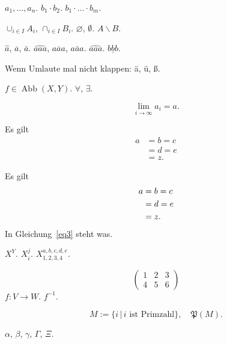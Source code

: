 \documentclass[a4paper,11pt]{article}
\renewcommand{\P}{{\mathfrak P}}
\newcommand{\Abb}{\operatorname{Abb}}
\theoremstyle{definition}
\theoremstyle{plain}
\begin{document}
\medskip

\noindent
$a_1, \dots, a_n$. $b_1 \cdot b_2$. $b_1 \cdot \dots \cdot b_m$.

\medskip

\noindent
$\cup_{i \in I} A_i$, $\cap_{i \in I} B_i$. $\varnothing$,
$\emptyset$. $A \backslash B$.

\medskip

\noindent
$\hat{a}$, $\overline{a}$, $\bar{a}$. $\hat{aaa}$, $\overline{aaa}$,
$\bar{aaa}$. $\widehat{aaa}$. $\underline{bbb}$.

\medskip

\noindent
Wenn Umlaute mal nicht klappen: \"a, \"u, \ss{}.

\medskip

\noindent
$f \in \Abb(X, Y)$. $\forall$, $\exists$.

\medskip

\noindent
$$\lim_{i \rightarrow \infty} a_i = a.$$

\medskip

\noindent
Es gilt \begin{align*} a & = b = c \\ & = d = e \\ & = z.
\end{align*}

\medskip

\noindent
Es gilt \begin{align} \notag a & = b = c \\ \label{eq3} & = d = e \\
\notag & = z.
\end{align}
In Gleichung~\eqref{eq3} steht was.

\medskip

\noindent
$X^Y$. $X_i^j$. $X^{a,b,c,d,e}_{1,2,3,4}$.

\medskip

\noindent
$$\begin{pmatrix} 1 & 2  & 3 \\ 4 & 5 & 6 \end{pmatrix}$$
$f : V \rightarrow W$. $f^{-1}$.

\medskip

\noindent
$$M := \{ i \,|\, i \text{ ist Primzahl} \}, \quad \P(M).$$


\medskip

\noindent
$\alpha$, $\beta$, $\gamma$, $\Gamma$, $\Xi$.

\medskip

\noindent
\end{document}
